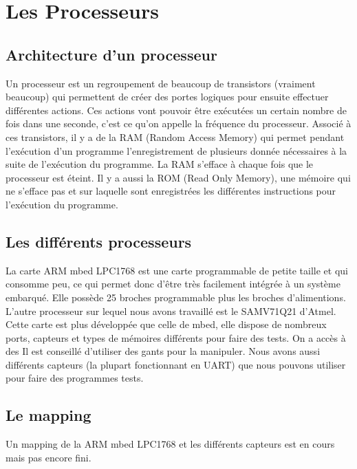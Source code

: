 \documentclass[12pt, a4paper, openright]{report}
\begin{document}
\section{Les Processeurs}
\subsection{Architecture d’un processeur}
Un processeur est un regroupement de beaucoup de transistors (vraiment beaucoup) qui permettent de créer des portes logiques pour ensuite effectuer différentes actions. Ces actions vont pouvoir être exécutées un certain nombre de fois dans une seconde, c’est ce qu’on appelle la fréquence du processeur. Associé à ces transistors, il y a de la RAM (Random Access Memory) qui permet pendant l’exécution d’un programme l’enregistrement de plusieurs donnée nécessaires à la suite de l’exécution du programme. La RAM s’efface à chaque fois que le processeur est éteint. Il y a aussi la ROM (Read Only Memory), une mémoire qui ne s’efface pas et sur laquelle sont enregistrées les différentes instructions pour l’exécution du programme.
\subsection{Les différents processeurs}
La carte ARM mbed LPC1768 est une carte programmable de petite taille et qui consomme peu, ce qui permet donc d’être très facilement intégrée à un système embarqué. Elle possède 25 broches programmable plus les broches d’alimentions.
L’autre processeur sur lequel nous avons travaillé est le SAMV71Q21 d’Atmel. Cette carte est plus développée que celle de mbed, elle dispose de nombreux ports, capteurs et types de mémoires différents pour faire des tests. On a accès à des  Il est conseillé d’utiliser des gants pour la manipuler. 
Nous avons aussi différents capteurs (la plupart fonctionnant en UART) que nous pouvons utiliser pour faire des programmes tests.
\subsection{Le mapping}
Un mapping de la ARM mbed LPC1768 et les différents capteurs est en cours mais pas encore fini.
\end{document}
